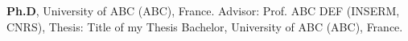 %
%
%


\begin{scholarship}
					{\textbf{Ph.D}, University of ABC (ABC), France.
                     Advisor: Prof. ABC DEF (INSERM, CNRS),
                    Thesis:  Title of my Thesis}
					{Bachelor, University of ABC (ABC), France.}
\end{scholarship}